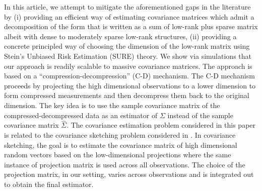 \documentclass[11pt,oneside]{amsart}
\begin{document}
In this article, we attempt to mitigate the aforementioned gaps in the literature by (i) providing an efficient way of estimating covariance matrices which admit a decomposition of the form that is written as a sum of low-rank plus sparse matrix albeit with dense to moderately sparse low-rank structures, (ii) providing a concrete principled way of choosing the dimension of the low-rank matrix using Stein's Unbiased Risk Estimation (SURE) theory. We show via simulations that our approach is readily scalable to massive covariance matrices. The approach is based on a ``compression-decompression'' (C-D) mechanism. The C-D mechanism proceeds by projecting the high dimensional observations to a lower dimension to form compressed measurements and then decompress them back to the original dimension. The key idea is to use the sample covariance matrix of the compressed-decompressed data as an estimator of $\Sigma$ instead of the sample covariance matrix ${\widehat{\Sigma}}$. The covariance estimation problem considered in this paper is related to the covariance sketching problem considered in \cite{dasarathy2015sketching}. In covariance sketching, the goal is to estimate the covariance matrix of high dimensional random vectors based on the low-dimensional projections where the same instance of projection matrix is used across all observations. The choice of the projection matrix, in our setting, varies across observations and is integrated out to obtain the final estimator.
\end{document}
